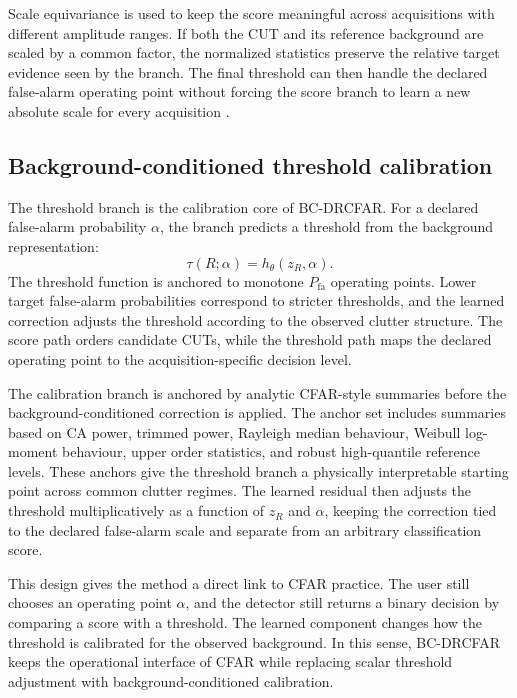 \documentclass[preprint,12pt]{elsarticle}
\begin{document}
Scale equivariance is used to keep the score meaningful across acquisitions
with different amplitude ranges. If both the CUT and its reference background
are scaled by a common factor, the normalized statistics preserve the relative
target evidence seen by the branch. The final threshold can then handle the
declared false-alarm operating point without forcing the score branch to learn a
new absolute scale for every acquisition \cite{kraut1999scale}.

\subsection{Background-conditioned threshold calibration}
\label{subsec:threshold-calibration}

The threshold branch is the calibration core of BC-DRCFAR. For a declared
false-alarm probability $\alpha$, the branch predicts a threshold from the
background representation:
\begin{equation}
  \tau(R;\alpha) = h_{\theta}(z_R,\alpha).
\end{equation}
The threshold function is anchored to monotone $P_{\mathrm{fa}}$ operating
points. Lower target false-alarm probabilities correspond to stricter
thresholds, and the learned correction adjusts the threshold according to the
observed clutter structure. The score path orders candidate CUTs, while the
threshold path maps the declared operating point to the acquisition-specific
decision level.

The calibration branch is anchored by analytic CFAR-style summaries before the
background-conditioned correction is applied. The anchor set includes summaries
based on CA power, trimmed power, Rayleigh median behaviour, Weibull log-moment
behaviour, upper order statistics, and robust high-quantile reference levels.
These anchors give the threshold branch a physically interpretable starting
point across common clutter regimes. The learned residual then adjusts the
threshold multiplicatively as a function of $z_R$ and $\alpha$, keeping the
correction tied to the declared false-alarm scale and separate from an
arbitrary classification score.

This design gives the method a direct link to CFAR practice. The user still
chooses an operating point $\alpha$, and the detector still returns a binary
decision by comparing a score with a threshold. The learned component changes
how the threshold is calibrated for the observed background. In this sense,
BC-DRCFAR keeps the operational interface of CFAR while replacing scalar
threshold adjustment with background-conditioned calibration.
\end{document}

